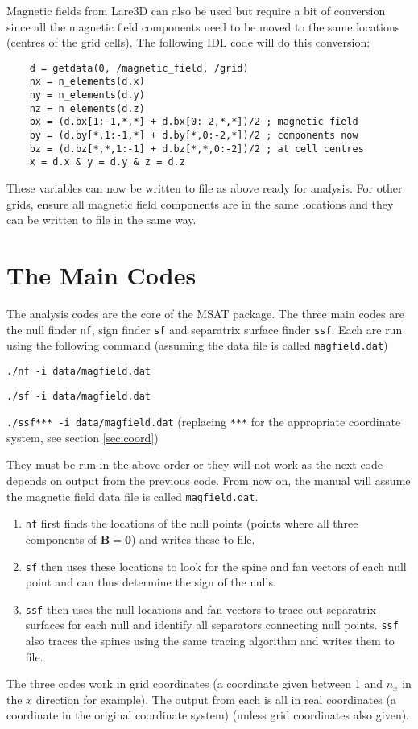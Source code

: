 \documentclass[12pt]{article}
\renewcommand{\vec}[1]{\mathbf{#1}}
\begin{document}
      Magnetic fields from Lare3D can also be used but require a bit of conversion since all the magnetic field components need to be moved to the same locations (centres of the grid cells). The following IDL code will do this conversion:

      \begin{verbatim}
    d = getdata(0, /magnetic_field, /grid)
    nx = n_elements(d.x)
    ny = n_elements(d.y)
    nz = n_elements(d.z)
    bx = (d.bx[1:-1,*,*] + d.bx[0:-2,*,*])/2 ; magnetic field
    by = (d.by[*,1:-1,*] + d.by[*,0:-2,*])/2 ; components now
    bz = (d.bz[*,*,1:-1] + d.bz[*,*,0:-2])/2 ; at cell centres
    x = d.x & y = d.y & z = d.z
      \end{verbatim}

      These variables can now be written to file as above ready for analysis. For other grids, ensure all magnetic field components are in the same locations and they can be written to file in the same way.

  \section{The Main Codes}

    The analysis codes are the core of the MSAT package. The three main codes are the null finder \texttt{nf}, sign finder \texttt{sf} and separatrix surface finder \texttt{ssf}. Each are run using the following command (assuming the data file is called \texttt{magfield.dat})

    \texttt{./nf -i data/magfield.dat}

    \texttt{./sf -i data/magfield.dat}
    
    \texttt{./ssf*** -i data/magfield.dat} (replacing \texttt{***} for the appropriate coordinate system, see section \ref{sec:coord})

    They must be run in the above order or they will not work as the next code depends on output from the previous code. From now on, the manual will assume the magnetic field data file is called \texttt{magfield.dat}.

    \begin{enumerate}
      \item \texttt{nf} first finds the locations of the null points (points where all three components of \( \vec{B} = \vec{0} \)) and writes these to file.
      \item \texttt{sf} then uses these locations to look for the spine and fan vectors of each null point and can thus determine the sign of the nulls.
      \item \texttt{ssf} then uses the null locations and fan vectors to trace out separatrix surfaces for each null and identify all separators connecting null points. \texttt{ssf} also traces the spines using the same tracing algorithm and writes them to file.
    \end{enumerate}
    The three codes work in grid coordinates (a coordinate given between 1 and \( n_x \) in the \( x \) direction for example). The output from each is all in real coordinates (a coordinate in the original coordinate system) (unless grid coordinates also given).
\end{document}
